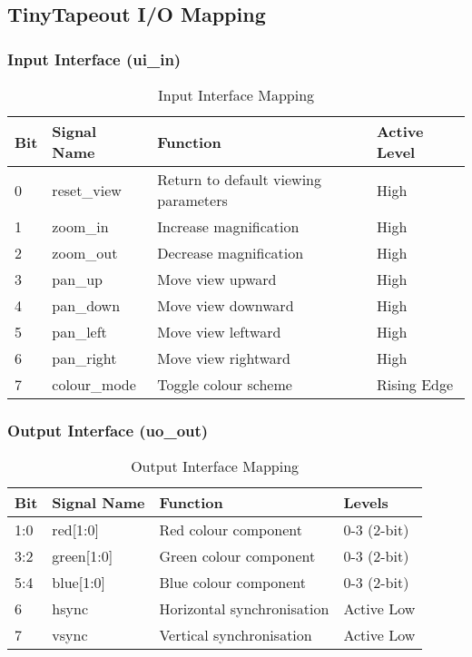 \documentclass[11pt,a4paper]{article}
\begin{document}
\subsection{TinyTapeout I/O Mapping}

\subsubsection{Input Interface (ui\_in)}
\begin{table}[h]
\centering
\begin{tabularx}{\textwidth}{|l|l|X|l|}
\hline
\rowcolor{blue!20}
\textbf{Bit} & \textbf{Signal Name} & \textbf{Function} & \textbf{Active Level} \\
\hline
0 & reset\_view & Return to default viewing parameters & High \\
1 & zoom\_in & Increase magnification & High \\
2 & zoom\_out & Decrease magnification & High \\
3 & pan\_up & Move view upward & High \\
4 & pan\_down & Move view downward & High \\
5 & pan\_left & Move view leftward & High \\
6 & pan\_right & Move view rightward & High \\
7 & colour\_mode & Toggle colour scheme & Rising Edge \\
\hline
\end{tabularx}
\caption{Input Interface Mapping}
\end{table}

\subsubsection{Output Interface (uo\_out)}
\begin{table}[h]
\centering
\begin{tabularx}{\textwidth}{|l|l|X|l|}
\hline
\rowcolor{red!20}
\textbf{Bit} & \textbf{Signal Name} & \textbf{Function} & \textbf{Levels} \\
\hline
1:0 & red[1:0] & Red colour component & 0-3 (2-bit) \\
3:2 & green[1:0] & Green colour component & 0-3 (2-bit) \\
5:4 & blue[1:0] & Blue colour component & 0-3 (2-bit) \\
6 & hsync & Horizontal synchronisation & Active Low \\
7 & vsync & Vertical synchronisation & Active Low \\
\hline
\end{tabularx}
\caption{Output Interface Mapping}
\end{table}
\end{document}
